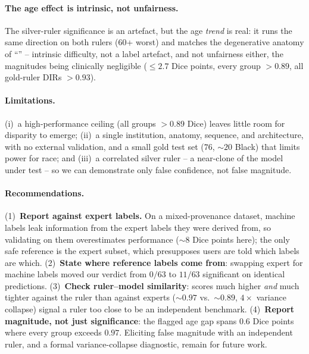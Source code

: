 \paragraph{The age effect is intrinsic, not unfairness.}
The silver-ruler significance is an artefact, but the age \emph{trend} is real: it
runs the same direction on both rulers (60+ worst) and matches the degenerative
anatomy of ``'' -- intrinsic difficulty, not a label
artefact, and not unfairness either, the magnitudes being clinically negligible
(${\le}2.7$ Dice points, every group $>0.89$, all gold-ruler DIRs $>0.93$).

\paragraph{Limitations.}
(i)~a high-performance ceiling (all groups $>0.89$ Dice) leaves little room for
disparity to emerge; (ii)~a single institution, anatomy, sequence, and architecture,
with no external validation, and a small gold test set ($76$, ${\sim}20$ Black) that
limits power for race; and (iii)~a correlated silver ruler -- a near-clone of the
model under test -- so we can demonstrate only false confidence, not false magnitude.

\paragraph{Recommendations.}
(1)~\textbf{Report against expert labels.} On a mixed-provenance dataset, machine
labels leak information from the expert labels they were derived from, so validating
on them overestimates performance (${\sim}8$ Dice points here); the only safe
reference is the expert subset, which presupposes users are told which labels are
which. (2)~\textbf{State where reference labels come from}: swapping expert for machine
labels moved our verdict from $0/63$ to $11/63$ significant on identical predictions.
(3)~\textbf{Check ruler--model similarity}: scores much higher \emph{and} much tighter
against the ruler than against experts (${\sim}0.97$ vs.\ ${\sim}0.89$, $4\times$
variance collapse) signal a ruler too close to be an independent benchmark.
(4)~\textbf{Report magnitude, not just significance}: the flagged age gap spans $0.6$
Dice points where every group exceeds $0.97$. Eliciting false magnitude with an
independent ruler, and a formal variance-collapse diagnostic, remain for future work.
